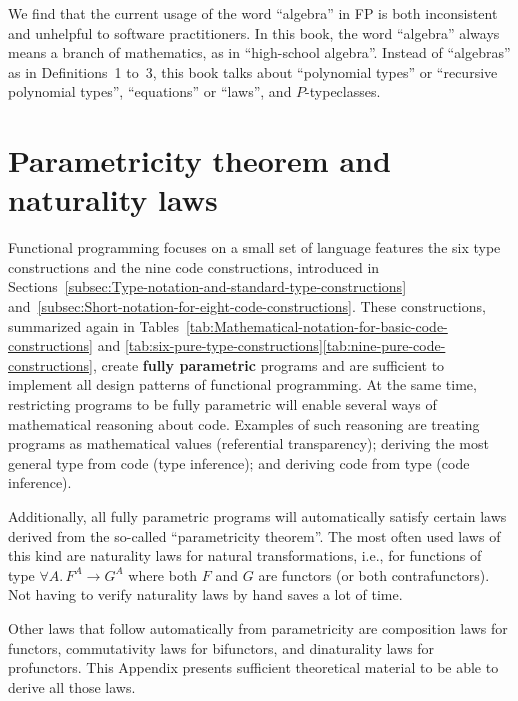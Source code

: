 We find that the current usage of the word \textsf{``}algebra\textsf{''} in FP is
both inconsistent and unhelpful to software practitioners. In this
book, the word \textsf{``}algebra\textsf{''} always means a branch of mathematics,
as in \textsf{``}high-school algebra\textsf{''}. Instead of \textsf{``}algebras\textsf{''} as in Definitions~1
to~3, this book talks about \textsf{``}polynomial types\textsf{''} or \textsf{``}recursive
polynomial types\textsf{''}, \textsf{``}equations\textsf{''} or \textsf{``}laws\textsf{''}, and $P$-typeclasses.

\chapter{Parametricity theorem and naturality laws\label{app:Proofs-of-naturality-parametricity}}

Functional programming focuses on a small set of language features
\textemdash{} the six type constructions and the nine code constructions,
introduced in Sections~\ref{subsec:Type-notation-and-standard-type-constructions}
and~\ref{subsec:Short-notation-for-eight-code-constructions}. These
constructions, summarized again in Tables~\ref{tab:Mathematical-notation-for-basic-code-constructions}
and \ref{tab:six-pure-type-constructions}\textendash \ref{tab:nine-pure-code-constructions},
create \textbf{fully parametric} programs
and are sufficient to implement all design patterns of functional
programming. At the same time, restricting programs to be fully parametric
will enable several ways of mathematical reasoning about code. Examples
of such reasoning are treating programs as mathematical values (referential
transparency); deriving the most
general type from code (type inference); and
deriving code from type (code inference).

Additionally, all fully parametric programs will automatically satisfy
certain laws derived from the so-called \textsf{``}parametricity theorem\textsf{''}.
The most often used laws of this kind are naturality laws for natural
transformations, i.e., for functions of type $\forall A.\,F^{A}\rightarrow G^{A}$
where both $F$ and $G$ are functors (or both contrafunctors). Not
having to verify naturality laws by hand saves a lot of time.

Other laws that follow automatically from parametricity are composition
laws for functors, commutativity laws for bifunctors, and dinaturality
laws for profunctors. This Appendix presents sufficient theoretical
material to be able to derive all those laws. 

